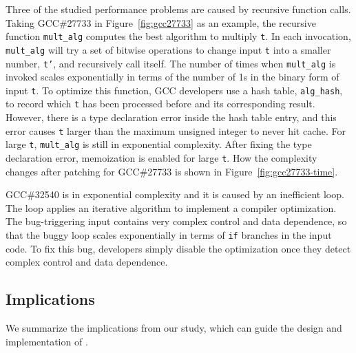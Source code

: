 Three of the studied performance problems are caused by recursive function calls. 
Taking GCC\#27733 in Figure~\ref{fig:gcc27733} as an example, 
the recursive function \texttt{mult\_alg} computes the best algorithm to multiply \texttt{t}.
In each invocation, \texttt{mult\_alg} will try a set of bitwise 
operations to change input 
\texttt{t} into a smaller number, \texttt{t'}, 
and recursively call itself.
The number of times when \texttt{mult\_alg} is invoked scales exponentially 
in terms of the number of 1s in the binary form of input \texttt{t}.
To optimize this function, 
GCC developers use a hash table, \texttt{alg\_hash}, to record
which \texttt{t} has been processed before and its corresponding result.
However, there is a type declaration error inside the hash table entry,
and this error causes \texttt{t} larger than the maximum unsigned integer to never hit cache.
For large \texttt{t}, \texttt{mult\_alg} is still in exponential complexity. 
After fixing the type declaration error, 
memoization is enabled for large \texttt{t}. 
How the complexity changes after patching for 
GCC\#27733 is shown in Figure~\ref{fig:gcc27733-time}.

GCC\#32540 is in exponential complexity and it is caused by an inefficient loop. 
The loop applies an iterative algorithm to implement a compiler optimization. 
The bug-triggering input contains very complex control and data dependence,  
so that the buggy loop scales exponentially in terms of 
\texttt{if} branches in the input code. 
To fix this bug, developers simply disable the optimization 
once they detect complex control and data dependence.  
 
\subsection{Implications}
\label{sec:study_impli}

We summarize the implications from our study, which can guide
the design and implementation of \Tool.

